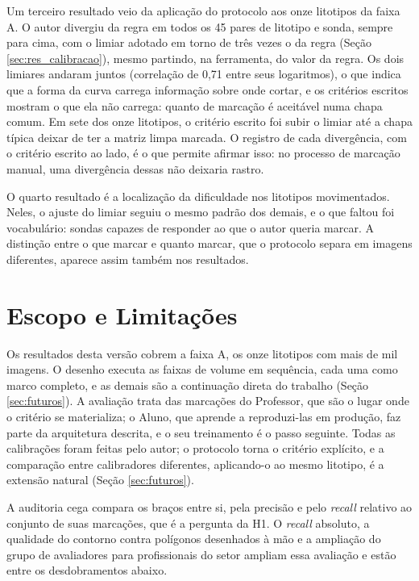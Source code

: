 Um terceiro resultado veio da aplicação do protocolo aos onze litotipos da faixa A. O autor divergiu da regra em todos os 45 pares de litotipo e sonda, sempre para cima, com o limiar adotado em torno de três vezes o da regra (Seção \ref{sec:res_calibracao}), mesmo partindo, na ferramenta, do valor da regra. Os dois limiares andaram juntos (correlação de 0,71 entre seus logaritmos), o que indica que a forma da curva carrega informação sobre onde cortar, e os critérios escritos mostram o que ela não carrega: quanto de marcação é aceitável numa chapa comum. Em sete dos onze litotipos, o critério escrito foi subir o limiar até a chapa típica deixar de ter a matriz limpa marcada. O registro de cada divergência, com o critério escrito ao lado, é o que permite afirmar isso: no processo de marcação manual, uma divergência dessas não deixaria rastro.

O quarto resultado é a localização da dificuldade nos litotipos movimentados. Neles, o ajuste do limiar seguiu o mesmo padrão dos demais, e o que faltou foi vocabulário: sondas capazes de responder ao que o autor queria marcar. A distinção entre o que marcar e quanto marcar, que o protocolo separa em imagens diferentes, aparece assim também nos resultados.

\section{Escopo e Limitações}
\label{sec:limitacoes}

Os resultados desta versão cobrem a faixa A, os onze litotipos com mais de mil imagens. O desenho executa as faixas de volume em sequência, cada uma como marco completo, e as demais são a continuação direta do trabalho (Seção \ref{sec:futuros}). A avaliação trata das marcações do Professor, que são o lugar onde o critério se materializa; o Aluno, que aprende a reproduzi-las em produção, faz parte da arquitetura descrita, e o seu treinamento é o passo seguinte. Todas as calibrações foram feitas pelo autor; o protocolo torna o critério explícito, e a comparação entre calibradores diferentes, aplicando-o ao mesmo litotipo, é a extensão natural (Seção \ref{sec:futuros}).

A auditoria cega compara os braços entre si, pela precisão e pelo \textit{recall} relativo ao conjunto de suas marcações, que é a pergunta da H1. O \textit{recall} absoluto, a qualidade do contorno contra polígonos desenhados à mão e a ampliação do grupo de avaliadores para profissionais do setor ampliam essa avaliação e estão entre os desdobramentos abaixo.

